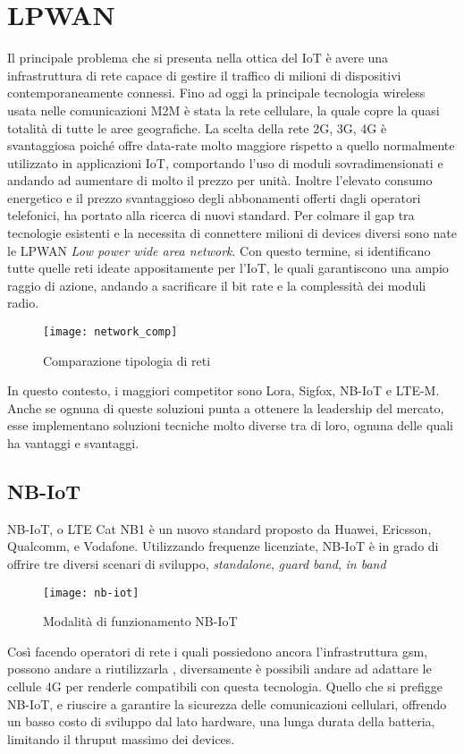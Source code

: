 \section{LPWAN}
Il principale problema che si presenta nella ottica del IoT è avere una
infrastruttura di rete capace di gestire il traffico di milioni di dispositivi
contemporaneamente connessi.  Fino ad oggi la principale tecnologia wireless 
usata nelle comunicazioni M2M è stata la rete cellulare, la quale copre la quasi
totalità di tutte le aree geografiche.
La scelta della rete 2G, 3G, 4G è svantaggiosa poiché offre data-rate molto
maggiore rispetto a quello normalmente utilizzato in applicazioni IoT,
comportando l'uso di moduli sovradimensionati e andando ad aumentare di molto il
prezzo per unità. Inoltre l'elevato consumo energetico e il prezzo svantaggioso
degli abbonamenti offerti dagli operatori telefonici, ha portato alla ricerca di
nuovi standard. 
Per colmare il gap tra tecnologie esistenti e la necessita di connettere milioni
di devices diversi sono nate le   LPWAN \emph{Low power wide area network}.
Con questo termine, si identificano tutte quelle reti ideate appositamente per
l'IoT, le quali garantiscono una ampio raggio di azione, andando a sacrificare
il bit rate e la complessità dei moduli radio.

\begin{figure}[h]
        \centering 
                \texttt{[image: network\_comp]}
        \caption{Comparazione tipologia di reti}
\end{figure}

In questo contesto, i maggiori competitor sono Lora, Sigfox, NB-IoT e LTE-M.
Anche se ognuna di queste soluzioni punta a ottenere la leadership del mercato,
esse implementano soluzioni tecniche molto diverse tra di loro, ognuna delle
quali ha vantaggi e svantaggi.
\subsection{NB-IoT}
NB-IoT, o LTE Cat NB1 è un nuovo standard proposto da Huawei, Ericsson, Qualcomm, e Vodafone.
Utilizzando frequenze licenziate, NB-IoT è in grado di offrire tre diversi
scenari di sviluppo, \emph{standalone}, \emph{guard band}, \emph{in band}

\begin{figure}[h]
        \centering 
                \texttt{[image: nb-iot]}
        \caption{Modalità di funzionamento NB-IoT}
\end{figure}
Così facendo operatori di rete i quali possiedono ancora l'infrastruttura gsm,
possono andare a riutilizzarla , diversamente è possibili andare ad adattare le
cellule 4G per renderle compatibili con questa tecnologia.
Quello che si prefigge NB-IoT, e riuscire a garantire la sicurezza delle
comunicazioni cellulari, offrendo un basso costo di sviluppo dal lato hardware,
una lunga durata della batteria, limitando il thruput massimo dei devices.



